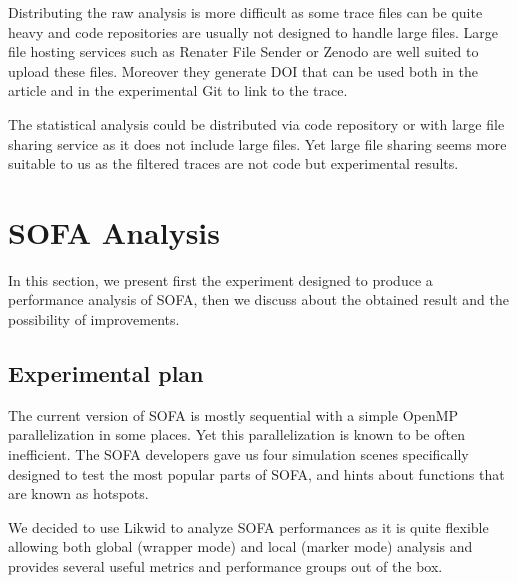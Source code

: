 Distributing the raw analysis is more difficult as some trace files can be quite heavy and code repositories are usually not designed to handle large files.
Large file hosting services such as Renater File Sender or Zenodo are well suited to upload these files.
Moreover they generate \gls{DOI} that can be used both in the article and in the experimental \gls{Git} to link to the trace.

The statistical analysis could be distributed via code repository or with large file sharing service as it does not include large files.
Yet large file sharing seems more suitable to us as the filtered traces are not code but experimental results.

\section{SOFA Analysis}
\label{sec:sofa-analysis}

In this section, we present first the experiment designed to produce a performance analysis of \gls{SOFA}, then we discuss about the obtained result and the possibility of improvements.

\subsection{Experimental plan}

The current version of \gls{SOFA} is mostly sequential with a simple \gls{OpenMP} parallelization in some places.
Yet this parallelization is known to be often inefficient.
The \gls{SOFA} developers gave us four simulation scenes specifically designed to test the most popular parts of \gls{SOFA}, and hints about functions that are known as hotspots.

We decided to use \gls{Likwid} to analyze \gls{SOFA} performances as it is quite flexible allowing both global (wrapper mode) and local (marker mode) analysis and provides several useful metrics and performance groups out of the box.

